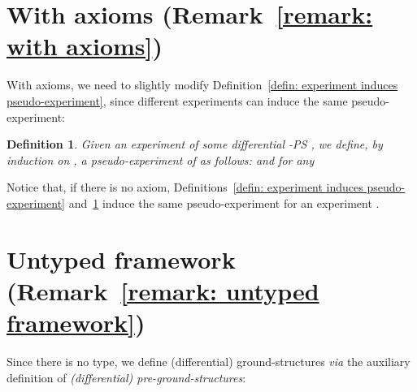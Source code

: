 \documentclass{article}
\theoremstyle{plain}
\newtheorem{definition}{Definition}
\begin{document}
\section{With axioms (Remark~\ref{remark: with axioms})}

With axioms, we need to slightly modify Definition~\ref{defin: experiment induces pseudo-experiment}, since different experiments can induce the same pseudo-experiment:

\begin{definition}\label{defin: experiment induces pseudo-experiment - with axioms}
Given an experiment  of some differential -PS , we define, by induction on , a pseudo-experiment  of  as follows:  and 
 for any 
\end{definition}

Notice that, if there is no axiom, Definitions~\ref{defin: experiment induces pseudo-experiment} and~\ref{defin: experiment induces pseudo-experiment - with axioms} induce the same pseudo-experiment  for an experiment .

\section{Untyped framework (Remark~\ref{remark: untyped framework})}

Since there is no type, we define (differential) ground-structures \emph{via} the auxiliary definition of \emph{(differential) pre-ground-structures}:
\end{document}
